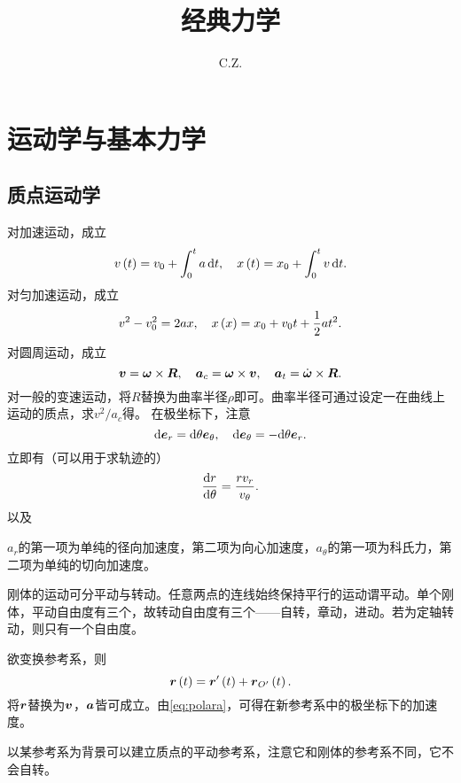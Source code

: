 \documentclass{ctexart}
\title{经典力学}
\author{C.Z.}
\begin{document}
\maketitle
\section{运动学与基本力学}
\subsection{质点运动学}
对加速运动，成立
\[ v\left(t\right) = v_0 + \int_{0}^{t} a \, \mathrm{d} t, \quad x\left(t\right) = x_0 + \int_{0}^{t} v \, \mathrm{d} t. \]
对匀加速运动，成立
\[ v^2 - v_0^2 = 2ax,\quad x\left(x\right) = x_0 + v_0t + \frac{1}{2} at^2. \]
对圆周运动，成立
\[ \boldsymbol{v} = \boldsymbol{\omega} \times \boldsymbol{R}, \quad \boldsymbol{a}_c = \boldsymbol{\omega} \times \boldsymbol{v}, \quad \boldsymbol{a}_t = \dot{\boldsymbol{\omega}} \times \boldsymbol{R}. \]
对一般的变速运动，将$R$替换为曲率半径$\rho$即可。曲率半径可通过设定一在曲线上运动的质点，求$v^2/a_c$得。
在极坐标下，注意
\[ \mathrm{d} \boldsymbol{e}_r =  \mathrm{d} \theta \boldsymbol{e}_\theta, \quad \mathrm{d} \boldsymbol{e}_\theta = -\mathrm{d}\theta \boldsymbol{e}_r.  \]
立即有（可以用于求轨迹的）
\[ \frac{\mathrm{d} r}{\mathrm{d} \theta} = \frac{rv_r}{v_\theta}. \]
以及
\par
$a_r$的第一项为单纯的径向加速度，第二项为向心加速度，$a_\theta$的第一项为科氏力，第二项为单纯的切向加速度。
\par
刚体的运动可分平动与转动。任意两点的连线始终保持平行的运动谓平动。单个刚体，平动自由度有三个，故转动自由度有三个——自转，章动，进动。若为定轴转动，则只有一个自由度。
\par
欲变换参考系，则
\[ \boldsymbol{r}\left(t\right) = \boldsymbol{r}'\left(t\right) + \boldsymbol{r}_{O'}\left(t\right). \]
将$\boldsymbol{r}$替换为$\boldsymbol{v}$，$\boldsymbol{a}$皆可成立。由\eqref{eq:polara}，可得在新参考系中的极坐标下的加速度。
\par
以某参考系为背景可以建立质点的平动参考系，注意它和刚体的参考系不同，它不会自转。

\end{document}
